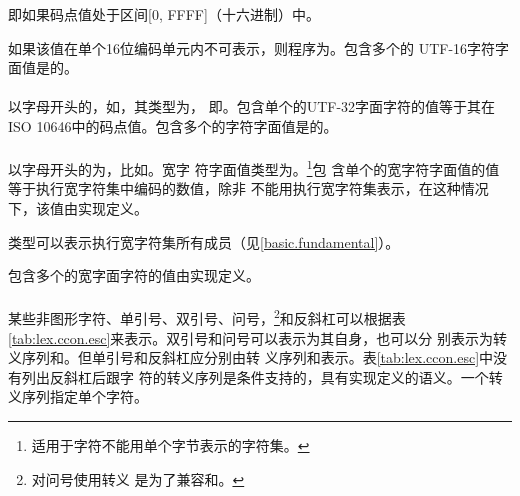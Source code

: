 \begin{note} %
  即如果码点值处于区间[0, FFFF]（十六进制）中。
\end{note}

如果该值在单个16位编码单元内不可表示，则程序为\illform{}。包含多个的
UTF-16字符字面值是\illform{}的。

\paragraph{} %
以字母开头的，如，其类型为，
即。包含单个的UTF-32字面字符的值等于其在ISO
10646中的码点值。包含多个的字符字面值是\illform{}的。

\paragraph{} %
\begin{sloppypar}
以字母开头的为，比如。宽字
符字面值类型为。\footnote{适用于字符不能用单个字节表示的字符集。}包
含单个的宽字符字面值的值等于执行宽字符集中编码的数值，除非
不能用执行宽字符集表示，在这种情况下，该值由实现定义。
\end{sloppypar}

\begin{note} %
  类型可以表示执行宽字符集所有成员（见\ref{basic.fundamental}）。
\end{note}

包含多个的宽字面字符的值由实现定义。

\paragraph{} %
某些非图形字符、单引号、双引号、问号，\footnote{对问号使用转义
是为了兼容\isocppfor{}和\isoc{}。}和反斜杠\tm{\bs}可以根据表
\ref{tab:lex.ccon.esc}来表示。双引号和问号可以表示为其自身，也可以分
别表示为转义序列和。但单引号和反斜杠\tm{\bs}应分别由转
义序列和\tm{\bs\bs}表示。表\ref{tab:lex.ccon.esc}中没有列出反斜杠后跟字
符的转义序列是条件支持的，具有实现定义的语义。一个转义序列指定单个字符。

